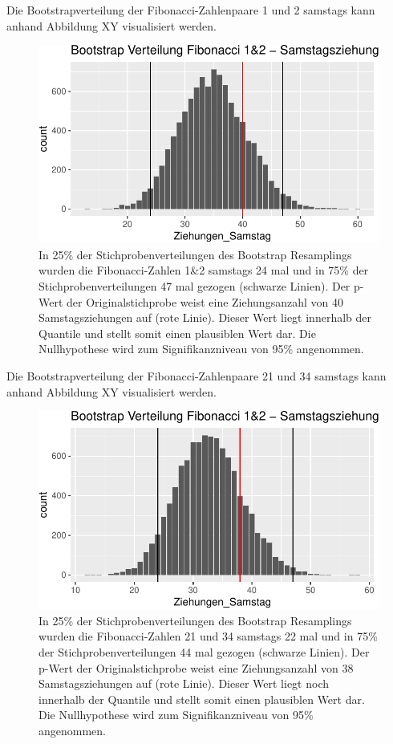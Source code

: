 \documentclass[ngerman,]{article}
\begin{document}
Die Bootstrapverteilung der Fibonacci-Zahlenpaare 1 und 2 samstags kann
anhand Abbildung XY visualisiert werden.

\begin{figure}

\includegraphics{Abbildung/Bootstrap_1_2sa-1} \hfill{}

\caption{In 25\% der Stichprobenverteilungen des Bootstrap Resamplings wurden die Fibonacci-Zahlen 1\&2 samstags 24 mal und in 75\% der Stichprobenverteilungen 47 mal gezogen (schwarze Linien). Der p-Wert der Originalstichprobe weist eine Ziehungsanzahl von 40 Samstagsziehungen auf (rote Linie). Dieser Wert liegt innerhalb der Quantile und stellt somit einen plausiblen Wert dar. Die Nullhypothese wird zum Signifikanzniveau von 95\% angenommen.}\label{fig:Bootstrap_1_2sa}
\end{figure}

Die Bootstrapverteilung der Fibonacci-Zahlenpaare 21 und 34 samstags
kann anhand Abbildung XY visualisiert werden.

\begin{figure}

\includegraphics{Abbildung/Bootstrap_21_34sa-1} \hfill{}

\caption{In 25\% der Stichprobenverteilungen des Bootstrap Resamplings wurden die Fibonacci-Zahlen 21 und 34 samstags 22 mal und in 75\% der Stichprobenverteilungen 44 mal gezogen (schwarze Linien). Der p-Wert der Originalstichprobe weist eine Ziehungsanzahl von 38 Samstagsziehungen auf (rote Linie). Dieser Wert liegt noch innerhalb der Quantile und stellt somit einen plausiblen Wert dar. Die Nullhypothese wird zum Signifikanzniveau von 95\% angenommen.}\label{fig:Bootstrap_21_34sa}
\end{figure}
\end{document}
